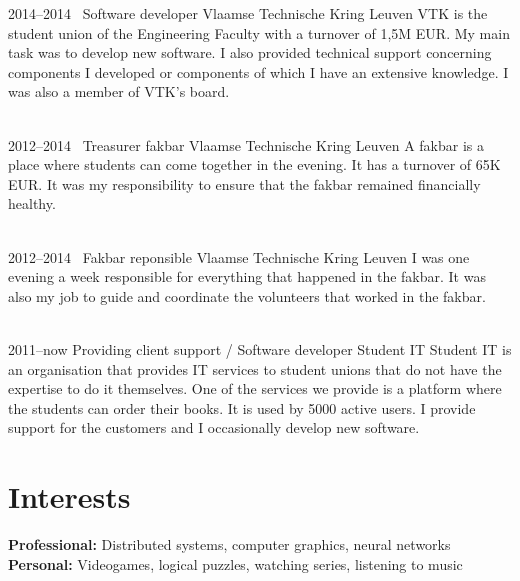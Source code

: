 \documentclass[a4paper]{friggeri-cv} %
\begin{document}
\begin{entrylist}
\entry
{2014--2014~}
{Software developer}
{Vlaamse Technische Kring Leuven}
{VTK is the student union of the Engineering Faculty with a turnover of 1,5M EUR. My main task was to develop new software. I also provided technical support concerning components I developed or components of which I have an extensive knowledge.
I was also a member of VTK’s board.\\
~}


\entry
{2012--2014~}
{Treasurer fakbar}
{Vlaamse Technische Kring Leuven}
{A fakbar is a place where students can come together in the evening. It has a turnover of 65K EUR. It was my responsibility to ensure that the fakbar remained financially healthy.\\
~}


\entry
{2012--2014~}
{Fakbar reponsible}
{Vlaamse Technische Kring Leuven}
{I was one evening a week responsible for everything that happened in the fakbar. It was also my job to guide and coordinate the volunteers that worked in the fakbar.\\
~}


\entry
{2011--now}
{Providing client support / Software developer}
{Student IT}
{Student IT is an organisation that provides IT services to student unions that do not have the expertise to do it themselves. One of the services we provide is a platform
where the students can order their books. It is used by 5000 active users.
I provide support for the customers and I occasionally develop new software.}

\end{entrylist}



\section{Interests}

\textbf{Professional:} Distributed systems, computer graphics,  neural networks\\
\textbf{Personal:} Videogames, logical puzzles, watching series, listening to music

\newpage
\addtolength{\oddsidemargin}{-1.7cm}
\addtolength{\evensidemargin}{-1.7cm}
\end{document}
